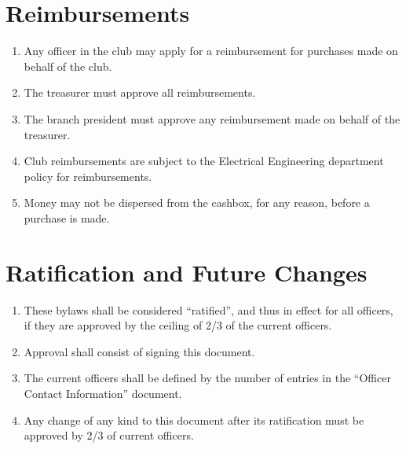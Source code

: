 \documentclass{article}
\begin{document}
\section{Reimbursements}
\begin{enumerate}
\item Any officer in the club may apply for a reimbursement for purchases made on behalf of the club.
\item The treasurer must approve all reimbursements.
\item The branch president must approve any reimbursement made on behalf of the treasurer.
\item Club reimbursements are subject to the Electrical Engineering department policy for reimbursements.
\item Money may not be dispersed from the cashbox, for any reason, before a purchase is made.
\end{enumerate}

\section{Ratification and Future Changes}
\begin{enumerate}
\item These bylaws shall be considered ``ratified'', and thus in effect for all officers, if they are approved by the ceiling of 2/3 of the current officers.
\item Approval shall consist of signing this document.
\item The current officers shall be defined by the number of entries in the ``Officer Contact Information'' document.
\item Any change of any kind to this document after its ratification must be approved by 2/3 of current officers.
\end{enumerate}
\end{document}
